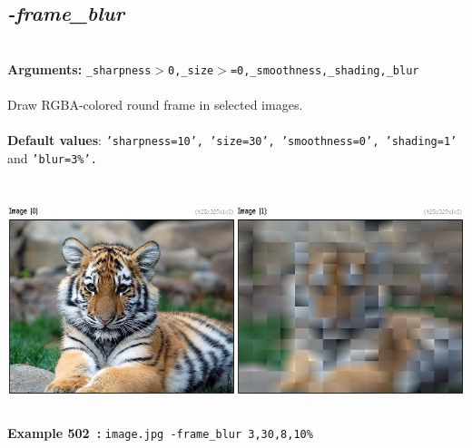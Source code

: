 \documentclass[a4paper,11pt,twoside]{book}
\begin{document}
\subsection{\emph{-frame\_blur} }\vspace*{-0.5em}
~\\\textbf{Arguments: } 
{\small \texttt{\_sharpness$>$0,\_size$>$=0,\_smoothness,\_shading,\_blur}}\\~\\
Draw RGBA-colored round frame in selected images.
~\\~\\\textbf{Default values}: {\small \texttt{'sharpness=10', 'size=30', 'smoothness=0', 'shading=1'} and \texttt{'blur=3\%'.}}
\begin{center}\includegraphics[keepaspectratio=true,height=7cm,width=\textwidth]{img/gmic_def502.jpg}\\
{\footnotesize \textbf{Example 502~:} \texttt{image.jpg -frame\_blur 3,30,8,10\%}}
\end{center}
\end{document}
